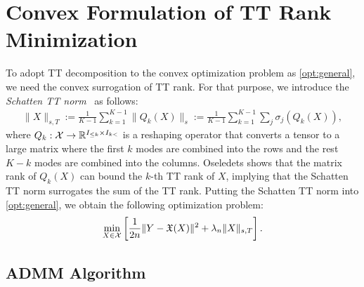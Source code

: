 \section{Convex Formulation of TT Rank Minimization}


To adopt TT decomposition to the convex optimization problem as
\eqref{opt:general}, we need the convex surrogation of TT rank.  For
that purpose, we introduce the \textit{Schatten TT
  norm}~\cite{phien2016efficient} as follows:
\begin{align}
	\|X\|_{s,T} := \frac{1}{K-1} \sum_{k=1}^{K-1} \|Q_k(X)\|_{s} := \frac{1}{K-1}\sum_{k=1}^{K-1} \sum_{j} \sigma_j(Q_k(X)), \label{def:ttnorm}
\end{align}
where $Q_k : \mathcal{X} \to \mathbb{R}^{I_{\leq k} \times I_{k<}}$ is a reshaping
operator that converts a tensor to a large matrix where the first $k$
modes are combined into the rows and the rest $K-k$ modes are combined
into the columns. Oseledets \etal \cite{oseledets2011tensor} shows that the matrix
rank of $Q_k(X)$ can bound the $k$-th TT rank of $X$, implying that the
Schatten TT norm surrogates the sum of the TT rank. Putting the
Schatten TT norm into \eqref{opt:general}, we obtain the following
optimization problem:
\begin{align}
	\min_{X \in \mathcal{X}} \left[ \frac{1}{2n}\| Y - \mathfrak{X}(X) \|^2 + \lambda_n\|X\|_{s,T} \right]. \label{eq:prob}
\end{align}


\subsection{ADMM Algorithm}

